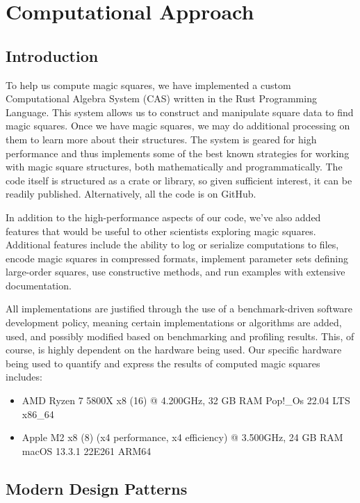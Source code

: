 \documentclass{rhumj_new}
\begin{document}
\section{Computational Approach}

\subsection{Introduction}

To help us compute magic squares, we have implemented a custom Computational Algebra System
(CAS) written in the Rust Programming Language. This system allows us to construct and manipulate
square data to find magic squares. Once we have magic squares, we may do additional processing on
them to learn more about their structures. The system is geared for high performance and thus
implements some of the best known strategies for working with magic square structures, both
mathematically and programmatically. The code itself is structured as a crate or library, so given sufficient
interest, it can be readily published. Alternatively, all the code is on GitHub\cite{Keough}.

In addition to the high-performance aspects of our code, we've also added features that would
be useful to other scientists exploring magic squares. Additional features include the ability to
log or serialize computations to files, encode magic squares in compressed formats, implement
parameter sets defining large-order squares, use constructive methods, and run examples with
extensive documentation.

All implementations are justified through the use of a benchmark-driven software development
policy, meaning certain implementations or algorithms are added, used, and possibly
modified based on benchmarking and profiling results. This, of course, is highly dependent on the
hardware being used. Our specific hardware being used to quantify and express the results of
computed magic squares includes:

\begin{itemize}
  \item AMD Ryzen 7 5800X x8 (16) @ 4.200GHz, 32 GB RAM \textemdash{}  Pop!\_Os 22.04 LTS x86\_64
  \item Apple M2 x8 (8) (x4 performance, x4 efficiency) @ 3.500GHz, 24 GB RAM \textemdash{} macOS
        13.3.1
        22E261 ARM64
\end{itemize}

\subsection{Modern Design Patterns}
\end{document}
